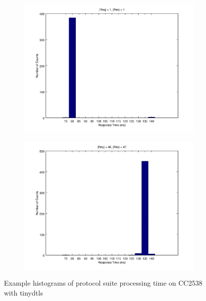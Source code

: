 \begin{figure}[ht!]
	\center
	\begin{subfigure}{.8\textwidth}
	\center
	\includegraphics[width=\linewidth]{fig/dtlstimehist_min.png}
	\end{subfigure}
	\begin{subfigure}{.8\textwidth}
	\center
	\includegraphics[width=\linewidth]{fig/dtlstimehist_max.png}
	\end{subfigure}
	\caption{Example histograms of protocol suite processing time on CC2538 with tinydtls}
	\label{Fig: Example histograms of protocol suite processing time on CC2538 with DTLS}
\end{figure}

